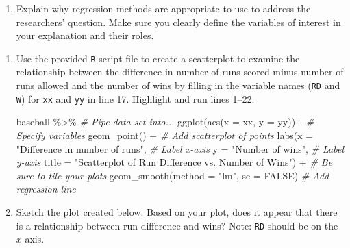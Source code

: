 \documentclass[
]{report}
\newenvironment{Shaded}{\begin{snugshade}}{\end{snugshade}}
\newcommand{\AttributeTok}[1]{\textcolor[rgb]{0.77,0.63,0.00}{#1}}
\newcommand{\CommentTok}[1]{\textcolor[rgb]{0.56,0.35,0.01}{\textit{#1}}}
\newcommand{\ConstantTok}[1]{\textcolor[rgb]{0.00,0.00,0.00}{#1}}
\newcommand{\FunctionTok}[1]{\textcolor[rgb]{0.00,0.00,0.00}{#1}}
\newcommand{\NormalTok}[1]{#1}
\newcommand{\SpecialCharTok}[1]{\textcolor[rgb]{0.00,0.00,0.00}{#1}}
\newcommand{\StringTok}[1]{\textcolor[rgb]{0.31,0.60,0.02}{#1}}
\providecommand{\tightlist}{%
  \setlength{\itemsep}{0pt}\setlength{\parskip}{0pt}}
\begin{document}
\begin{enumerate}
\def\labelenumi{\arabic{enumi}.}
\tightlist
\item
  Explain why regression methods are appropriate to use to address the researchers' question. Make sure you clearly define the variables of interest in your explanation and their roles.
\end{enumerate}

\vspace{.5in}

\begin{enumerate}
\def\labelenumi{\arabic{enumi}.}
\setcounter{enumi}{1}
\item
  Use the provided \texttt{R} script file to create a scatterplot to examine the relationship between the difference in number of runs scored minus number of runs allowed and the number of wins by filling in the variable names (\texttt{RD} and \texttt{W}) for \texttt{xx} and \texttt{yy} in line 17. Highlight and run lines 1--22.

\begin{Shaded}
\begin{Highlighting}[]
\NormalTok{baseball }\SpecialCharTok{\%\textgreater{}\%} \CommentTok{\# Pipe data set into...}
\FunctionTok{ggplot}\NormalTok{(}\FunctionTok{aes}\NormalTok{(}\AttributeTok{x =}\NormalTok{ xx, }\AttributeTok{y =}\NormalTok{ yy))}\SpecialCharTok{+}  \CommentTok{\# Specify variables}
  \FunctionTok{geom\_point}\NormalTok{() }\SpecialCharTok{+}  \CommentTok{\# Add scatterplot of points}
  \FunctionTok{labs}\NormalTok{(}\AttributeTok{x =} \StringTok{"Difference in number of runs"}\NormalTok{,  }\CommentTok{\# Label x{-}axis}
       \AttributeTok{y =} \StringTok{"Number of wins"}\NormalTok{,  }\CommentTok{\# Label y{-}axis}
       \AttributeTok{title =} \StringTok{"Scatterplot of Run Difference vs. Number of Wins"}\NormalTok{) }\SpecialCharTok{+} 
               \CommentTok{\# Be sure to tile your plots}
  \FunctionTok{geom\_smooth}\NormalTok{(}\AttributeTok{method =} \StringTok{"lm"}\NormalTok{, }\AttributeTok{se =} \ConstantTok{FALSE}\NormalTok{)  }\CommentTok{\# Add regression line}
\end{Highlighting}
\end{Shaded}
\item
  Sketch the plot created below. Based on your plot, does it appear that there is a relationship between run difference and wins? Note: \texttt{RD} should be on the \(x\)-axis.
\end{enumerate}
\end{document}

